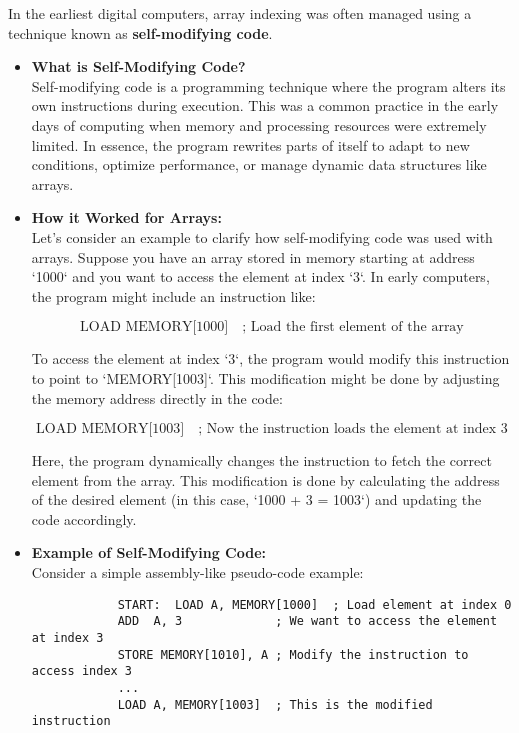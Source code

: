 \documentclass{book}
\begin{document}
	In the earliest digital computers, array indexing was often managed using a technique known as \textbf{self-modifying code}.
	
	\begin{itemize}
		\item \textbf{What is Self-Modifying Code?} \\
		Self-modifying code is a programming technique where the program alters its own instructions during execution. This was a common practice in the early days of computing when memory and processing resources were extremely limited. In essence, the program rewrites parts of itself to adapt to new conditions, optimize performance, or manage dynamic data structures like arrays.
		
		\item \textbf{How it Worked for Arrays:} \\
		Let's consider an example to clarify how self-modifying code was used with arrays. Suppose you have an array stored in memory starting at address `1000` and you want to access the element at index `3`. In early computers, the program might include an instruction like:
		
		\[
		\text{LOAD } \text{MEMORY[1000]} \quad \text{; Load the first element of the array}
		\]
		
		To access the element at index `3`, the program would modify this instruction to point to `MEMORY[1003]`. This modification might be done by adjusting the memory address directly in the code:
		
		\[
		\text{LOAD } \text{MEMORY[1003]} \quad \text{; Now the instruction loads the element at index 3}
		\]
		
		Here, the program dynamically changes the instruction to fetch the correct element from the array. This modification is done by calculating the address of the desired element (in this case, `1000 + 3 = 1003`) and updating the code accordingly.
		
		\item \textbf{Example of Self-Modifying Code:} \\
		Consider a simple assembly-like pseudo-code example:
		\begin{verbatim}
			START:  LOAD A, MEMORY[1000]  ; Load element at index 0
			ADD  A, 3             ; We want to access the element at index 3
			STORE MEMORY[1010], A ; Modify the instruction to access index 3
			...
			LOAD A, MEMORY[1003]  ; This is the modified instruction
		\end{verbatim}
		

\end{itemize}
\end{document}
